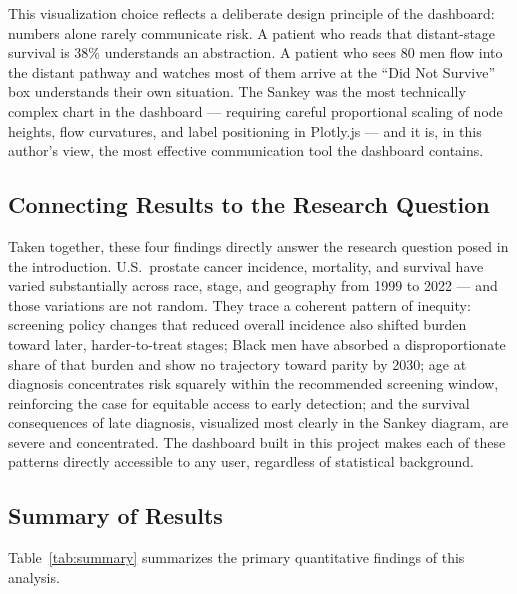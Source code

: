 This visualization choice reflects a deliberate design principle of the dashboard:
numbers alone rarely communicate risk. A patient who reads that distant-stage
survival is 38\% understands an abstraction. A patient who sees 80 men flow into
the distant pathway and watches most of them arrive at the ``Did Not Survive'' box
understands their own situation. The Sankey was the most technically complex chart
in the dashboard --- requiring careful proportional scaling of node heights, flow
curvatures, and label positioning in Plotly.js --- and it is, in this author's view,
the most effective communication tool the dashboard contains.

\subsection{Connecting Results to the Research Question}

Taken together, these four findings directly answer the research question posed in
the introduction. U.S.\ prostate cancer incidence, mortality, and survival have
varied substantially across race, stage, and geography from 1999 to 2022 --- and
those variations are not random. They trace a coherent pattern of inequity:
screening policy changes that reduced overall incidence also shifted burden toward
later, harder-to-treat stages; Black men have absorbed a disproportionate share of
that burden and show no trajectory toward parity by 2030; age at diagnosis
concentrates risk squarely within the recommended screening window, reinforcing
the case for equitable access to early detection; and the survival consequences of
late diagnosis, visualized most clearly in the Sankey diagram, are severe and
concentrated. The dashboard built in this project makes each of these patterns
directly accessible to any user, regardless of statistical background.

\subsection{Summary of Results}

Table~\ref{tab:summary} summarizes the primary quantitative findings of this
analysis.

